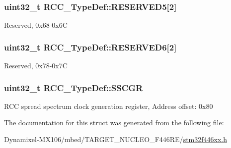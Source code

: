\subsubsection[{\texorpdfstring{R\+E\+S\+E\+R\+V\+E\+D5}{RESERVED5}}]{\setlength{\rightskip}{0pt plus 5cm}uint32\+\_\+t R\+C\+C\+\_\+\+Type\+Def\+::\+R\+E\+S\+E\+R\+V\+E\+D5\mbox{[}2\mbox{]}}\hypertarget{struct_r_c_c___type_def_af9159a971013ef0592be8be3e256a344}{}\label{struct_r_c_c___type_def_af9159a971013ef0592be8be3e256a344}
Reserved, 0x68-\/0x6C 
\subsubsection[{\texorpdfstring{R\+E\+S\+E\+R\+V\+E\+D6}{RESERVED6}}]{\setlength{\rightskip}{0pt plus 5cm}uint32\+\_\+t R\+C\+C\+\_\+\+Type\+Def\+::\+R\+E\+S\+E\+R\+V\+E\+D6\mbox{[}2\mbox{]}}\hypertarget{struct_r_c_c___type_def_a30cfd1a2f2eb931bacfd2be965e53d1b}{}\label{struct_r_c_c___type_def_a30cfd1a2f2eb931bacfd2be965e53d1b}
Reserved, 0x78-\/0x7C 
\subsubsection[{\texorpdfstring{S\+S\+C\+GR}{SSCGR}}]{ uint32\+\_\+t R\+C\+C\+\_\+\+Type\+Def\+::\+S\+S\+C\+GR}\hypertarget{struct_r_c_c___type_def_a52270ad1423c68cd536f62657bb669f5}{}\label{struct_r_c_c___type_def_a52270ad1423c68cd536f62657bb669f5}
R\+CC spread spectrum clock generation register, Address offset\+: 0x80 

The documentation for this struct was generated from the following file\+:\begin{DoxyCompactItemize}
\item 
Dynamixel-\/\+M\+X106/mbed/\+T\+A\+R\+G\+E\+T\+\_\+\+N\+U\+C\+L\+E\+O\+\_\+\+F446\+R\+E/\hyperlink{stm32f446xx_8h}{stm32f446xx.\+h}\end{DoxyCompactItemize}
